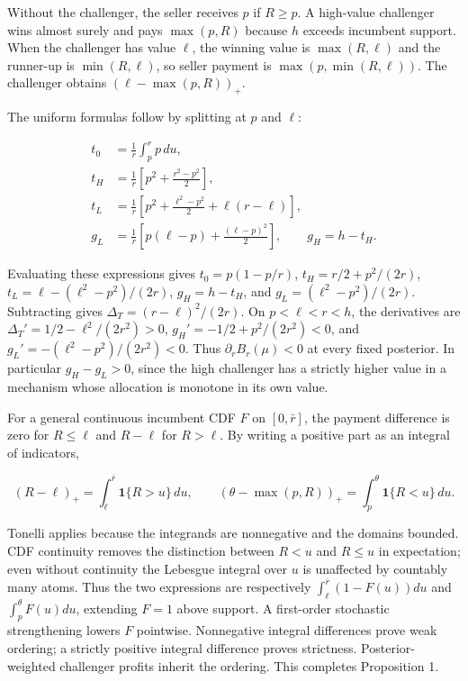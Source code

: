 \documentclass[
  11pt,
]{article}
\begin{document}
Without the challenger, the seller receives \(p\) if \(R\ge p\). A
high-value challenger wins almost surely and pays \(\max(p,R)\) because
\(h\) exceeds incumbent support. When the challenger has value \(\ell\),
the winning value is \(\max(R,\ell)\) and the runner-up is
\(\min(R,\ell)\), so seller payment is \(\max(p,\min(R,\ell))\). The
challenger obtains \((\ell-\max(p,R))_+\).

The uniform formulas follow by splitting at \(p\) and \(\ell\):

\[
\begin{aligned}
t_0&=\frac1r\int_p^r p\,du,\\
t_H&=\frac1r\left[p^2+\frac{r^2-p^2}{2}\right],\\
t_L&=\frac1r\left[p^2+\frac{\ell^2-p^2}{2}+\ell(r-\ell)\right],\\
g_L&=\frac1r\left[p(\ell-p)+\frac{(\ell-p)^2}{2}\right],\qquad g_H=h-t_H.
\end{aligned}
\tag{OA.5}\label{eq:oa-oa-5}
\]

Evaluating these expressions gives \(t_0=p(1-p/r)\),
\(t_H=r/2+p^2/(2r)\), \(t_L=\ell-(\ell^2-p^2)/(2r)\), \(g_H=h-t_H\), and
\(g_L=(\ell^2-p^2)/(2r)\). Subtracting gives
\(\Delta_T=(r-\ell)^2/(2r)\). On \(p<\ell<r<h\), the derivatives are
\(\Delta_T'=1/2-\ell^2/(2r^2)>0\), \(g_H'=-1/2+p^2/(2r^2)<0\), and
\(g_L'=-(\ell^2-p^2)/(2r^2)<0\). Thus \(\partial_rB_r(\mu)<0\) at every
fixed posterior. In particular \(g_H-g_L>0\), since the high challenger
has a strictly higher value in a mechanism whose allocation is monotone
in its own value.

For a general continuous incumbent CDF \(F\) on \([0,\bar r]\), the
payment difference is zero for \(R\le\ell\) and \(R-\ell\) for
\(R>\ell\). By writing a positive part as an integral of indicators,

\[
(R-\ell)_+=\int_\ell^{\bar r}\mathbf1\{R>u\}\,du,
\qquad
(\theta-\max(p,R))_+=\int_p^\theta\mathbf1\{R<u\}\,du.
\tag{OA.6}\label{eq:oa-oa-6}
\]

Tonelli applies because the integrands are nonnegative and the domains
bounded. CDF continuity removes the distinction between \(R<u\) and
\(R\le u\) in expectation; even without continuity the Lebesgue integral
over \(u\) is unaffected by countably many atoms. Thus the two
expressions are respectively \(\int_\ell^{\bar r}(1-F(u))du\) and
\(\int_p^\theta F(u)du\), extending \(F=1\) above support. A first-order
stochastic strengthening lowers \(F\) pointwise. Nonnegative integral
differences prove weak ordering; a strictly positive integral difference
proves strictness. Posterior-weighted challenger profits inherit the
ordering. This completes Proposition 1.
\end{document}

